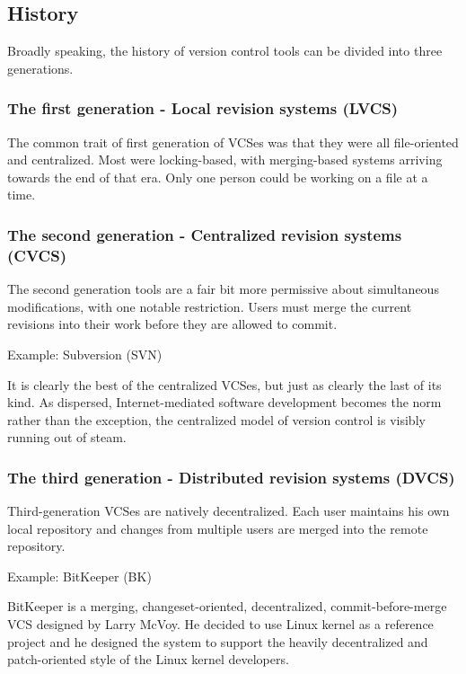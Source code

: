 \documentclass{article}
\begin{document}
\subsection*{History}
Broadly speaking, the history of version control tools can be divided
into three generations.

\subsubsection*{The first generation - Local revision systems (LVCS)}

The common trait of first generation of VCSes was that they were all
file-oriented and centralized. Most were locking-based, with
merging-based systems arriving towards the end of that era. Only one
person could be working on a file at a time. 

\subsubsection*{The second generation - Centralized revision systems (CVCS)}

The second generation tools are a fair bit more permissive about
simultaneous modifications, with one notable restriction. Users must
merge the current revisions into their work before they are allowed to
commit. 

Example: Subversion (SVN)

It is clearly the best of the centralized VCSes, but just as clearly
the last of its kind. As dispersed, Internet-mediated software
development becomes the norm rather than the exception, the
centralized model of version control is visibly running out of steam.

\subsubsection*{The third generation - Distributed revision systems (DVCS)}

Third-generation VCSes are natively decentralized. Each user maintains
his own local repository and changes from multiple users are merged 
into the remote repository.

Example: BitKeeper (BK)

BitKeeper is a merging, changeset-oriented, decentralized,
commit-before-merge VCS designed by Larry McVoy.
He decided to use Linux kernel as a reference project and he designed
the system to support the heavily decentralized and patch-oriented
style of the Linux kernel developers.
\end{document}
